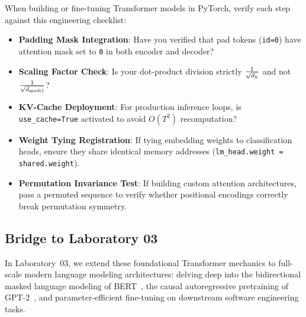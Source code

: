 \documentclass[../labs.tex]{subfiles}
\begin{document}
When building or fine-tuning Transformer models in PyTorch, verify each step against this engineering checklist:
\begin{itemize}
    \item[$\square$] \textbf{Padding Mask Integration}: Have you verified that pad tokens (\texttt{id=0}) have attention mask set to \texttt{0} in both encoder and decoder?
    \item[$\square$] \textbf{Scaling Factor Check}: Is your dot-product division strictly $\frac{1}{\sqrt{d_k}}$ and not $\frac{1}{\sqrt{d_{\text{model}}}}$?
    \item[$\square$] \textbf{KV-Cache Deployment}: For production inference loops, is \texttt{use\_cache=True} activated to avoid $O(T^2)$ recomputation?
    \item[$\square$] \textbf{Weight Tying Registration}: If tying embedding weights to classification heads, ensure they share identical memory addresses (\texttt{lm\_head.weight = shared.weight}).
    \item[$\square$] \textbf{Permutation Invariance Test}: If building custom attention architectures, pass a permuted sequence to verify whether positional encodings correctly break permutation symmetry.
\end{itemize}

\subsection{Bridge to Laboratory 03}
In Laboratory~03, we extend these foundational Transformer mechanics to full-scale modern language modeling architectures: delving deep into the bidirectional masked language modeling of BERT~\cite{devlin2019}, the causal autoregressive pretraining of GPT-2~\cite{radford2019}, and parameter-efficient fine-tuning on downstream software engineering tasks.
\end{document}

